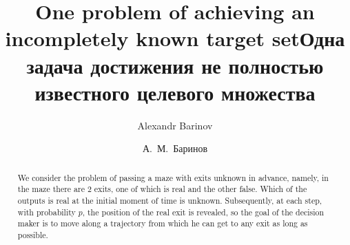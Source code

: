\begin{englishtitle} %
\title{One problem of achieving an incompletely known target set}
\author{Alexandr Barinov} 


\maketitle

\begin{abstract}
We consider the problem of passing a maze with exits unknown in advance, namely, in the maze there are $2$ exits, one of which is real and the other false. Which of the outputs is real at the initial moment of time is unknown. Subsequently, at each step, with probability $p$, the position of the real exit is revealed, so the goal of the decision maker is to move along a trajectory from which he can get to any exit as long as possible.

\end{abstract}
\end{englishtitle}

\iffalse
%
%


\documentclass[12pt]{llncs}  


\usepackage{iftex}

\ifPDFTeX
\usepackage[T2A]{fontenc}
\usepackage[utf8]{inputenc} %
\usepackage[english,russian]{babel}
\fi

\usepackage{todonotes} 

\usepackage[russian]{nla}


\fi

\title{Одна задача достижения не полностью известного целевого множества}%
\author{А.~М.~Баринов
}

